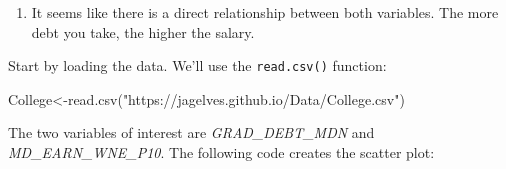 \documentclass[
  letterpaper,
  DIV=11,
  numbers=noendperiod]{scrreprt}
\newenvironment{Shaded}{\begin{snugshade}}{\end{snugshade}}
\newcommand{\AttributeTok}[1]{\textcolor[rgb]{0.40,0.45,0.13}{#1}}
\newcommand{\ConstantTok}[1]{\textcolor[rgb]{0.56,0.35,0.01}{#1}}
\newcommand{\DecValTok}[1]{\textcolor[rgb]{0.68,0.00,0.00}{#1}}
\newcommand{\FunctionTok}[1]{\textcolor[rgb]{0.28,0.35,0.67}{#1}}
\newcommand{\NormalTok}[1]{\textcolor[rgb]{0.00,0.23,0.31}{#1}}
\newcommand{\OtherTok}[1]{\textcolor[rgb]{0.00,0.23,0.31}{#1}}
\newcommand{\SpecialCharTok}[1]{\textcolor[rgb]{0.37,0.37,0.37}{#1}}
\newcommand{\StringTok}[1]{\textcolor[rgb]{0.13,0.47,0.30}{#1}}
\providecommand{\tightlist}{%
  \setlength{\itemsep}{0pt}\setlength{\parskip}{0pt}}\usepackage{longtable,booktabs,array}
\begin{document}
\begin{enumerate}
\def\labelenumi{\arabic{enumi}.}
\tightlist
\item
  It seems like there is a direct relationship between both variables.
  The more debt you take, the higher the salary.
\end{enumerate}

Start by loading the data. We'll use the \texttt{read.csv()} function:

\begin{Shaded}
\begin{Highlighting}[numbers=left,,]
\NormalTok{College}\OtherTok{\textless{}{-}}\FunctionTok{read.csv}\NormalTok{(}\StringTok{"https://jagelves.github.io/Data/College.csv"}\NormalTok{)}
\end{Highlighting}
\end{Shaded}

The two variables of interest are \emph{GRAD\_DEBT\_MDN} and
\emph{MD\_EARN\_WNE\_P10}. The following code creates the scatter plot:

\begin{Shaded}
\end{Shaded}
\end{document}
